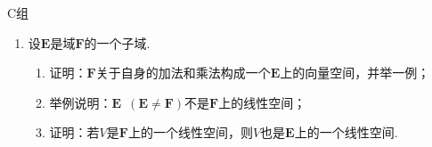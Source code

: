 \centerline{\heiti C组}
\begin{enumerate}
    \item 设$\mathbf{E}$是域$\mathbf{F}$的一个子域.
          \begin{enumerate}
              \item 证明：$\mathbf{F}$关于自身的加法和乘法构成一个$\mathbf{E}$上的向量空间，并举一例；

              \item 举例说明：$\mathbf{E}\enspace(\mathbf{E}\neq \mathbf{F})$不是$\mathbf{F}$上的线性空间；

              \item 证明：若$V$是$\mathbf{F}$上的一个线性空间，则$V$也是$\mathbf{E}$上的一个线性空间.
          \end{enumerate}
\end{enumerate}
